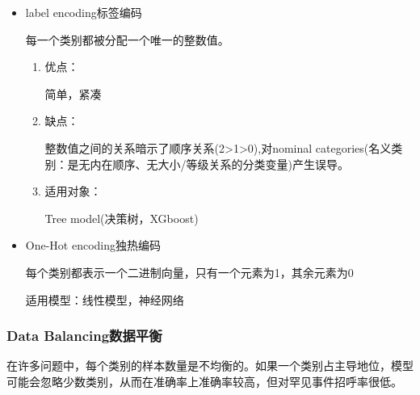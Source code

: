 \documentclass[UTF8]{ctexart}
\begin{document}
\begin{itemize}
    \item label encoding标签编码
    
    每一个类别都被分配一个唯一的整数值。
    \begin{enumerate}
        \item 优点：
        
        简单，紧凑
        \item 缺点：
        
        整数值之间的关系暗示了顺序关系(2>1>0),对nominal categories(名义类别：是无内在顺序、无大小/等级关系的分类变量)产生误导。

        \item 适用对象：
        
        Tree model(决策树，XGboost)
    \end{enumerate}
    \item One-Hot encoding独热编码
    
    每个类别都表示一个二进制向量，只有一个元素为1，其余元素为0

    适用模型：线性模型，神经网络
\end{itemize}

\subsubsection{Data Balancing数据平衡}
在许多问题中，每个类别的样本数量是不均衡的。如果一个类别占主导地位，模型可能会忽略少数类别，从而在准确率上准确率较高，但对罕见事件招呼率很低。
\end{document}

